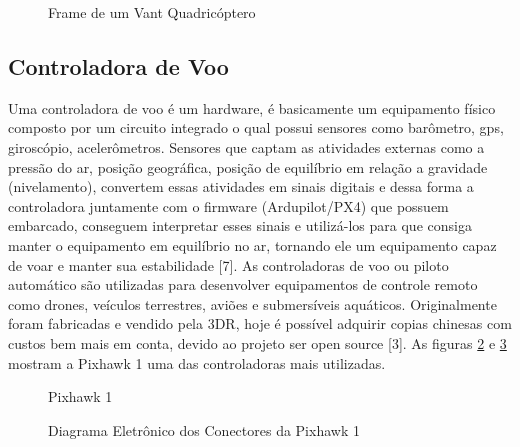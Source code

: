 \begin{figure}[H]
	\centering
	\caption{Frame de um Vant Quadricóptero}
	\fontsize{9pt}{12pt}\selectfont
	\def\svgwidth{13cm}
	
	\label{fig:frame}
\end{figure}

\subsection{Controladora de Voo}
Uma controladora de voo é um hardware, é basicamente um equipamento físico composto por um circuito integrado o qual possui sensores como barômetro, gps, giroscópio, acelerômetros. Sensores que captam as atividades externas como a pressão do ar, posição geográfica, posição de equilíbrio em relação a gravidade (nivelamento), convertem essas atividades em sinais digitais e dessa forma a controladora juntamente com o firmware (Ardupilot/PX4) que possuem embarcado, conseguem interpretar esses sinais e utilizá-los para que consiga manter o equipamento em equilíbrio no ar, tornando ele um equipamento capaz de voar   e manter sua estabilidade [7].     
As controladoras de voo ou piloto automático são utilizadas para desenvolver equipamentos de controle remoto como drones, veículos terrestres, aviões e submersíveis aquáticos. Originalmente foram fabricadas e vendido pela 3DR, hoje é possível adquirir copias chinesas com custos bem mais em conta, devido ao projeto ser open source [3].
As figuras \ref{fig:pixhawk} e \ref{fig:pixhawkCirc} mostram a Pixhawk 1 uma das controladoras mais utilizadas.

%
\begin{figure}[H]
	\centering
	\caption{Pixhawk 1}
	\fontsize{9pt}{12pt}\selectfont
	\def\svgwidth{13cm}
	
	\label{fig:pixhawk}
\end{figure}

%
\begin{figure}[H]
	\centering
	\caption{Diagrama Eletrônico dos Conectores da Pixhawk 1}
	\fontsize{9pt}{12pt}\selectfont
	\def\svgwidth{13cm}
	
	\label{fig:pixhawkCirc}
\end{figure}


